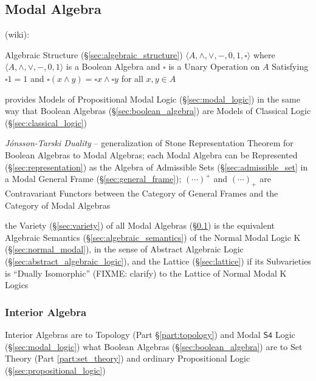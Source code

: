 \subsection{Modal Algebra}\label{sec:modal_algebra}

(wiki):

Algebraic Structure (\S\ref{sec:algebraic_structure}) $\langle{A, \wedge, \vee,
  -, 0, 1, \square}\rangle$ where $\langle{A, \wedge, \vee, -, 0, 1}\rangle$ is
a Boolean Algebra and $\square$ is a Unary Operation on $A$ Satisfying
$\square{1} = 1$ and $\square(x \wedge y) = \square x \wedge \square y$ for all
$x, y \in A$

provides Models of Propositional Modal Logic (\S\ref{sec:modal_logic}) in the
same way that Boolean Algebras (\S\ref{sec:boolean_algebra}) are Models of
Classical Logic (\S\ref{sec:classical_logic})

\emph{J\'onsson-Tarski Duality} -- generalization of Stone Representation
Theorem for Boolean Algebras to Modal Algebras; each Modal Algebra can be
Represented (\S\ref{sec:representation}) as the Algebra of Admissible Sets
(\S\ref{sec:admissible_set} in a Modal General Frame
(\S\ref{sec:general_frame}); $(\cdots)^+$ and $(\cdots)_+$ are Contravariant
Functors between the Category of General Frames and the Category of Modal
Algebras

the Variety (\S\ref{sec:variety}) of all Modal Algebras
(\S\ref{sec:modal_algebra}) is the equivalent Algebraic Semantics
(\S\ref{sec:algebraic_semantics}) of the Normal Modal Logic $\mathrm{K}$
(\S\ref{sec:normal_modal}), in the sense of Abstract Algebraic Logic
(\S\ref{sec:abstract_algebraic_logic}), and the Lattice (\S\ref{sec:lattice}) if
its Subvarieties is ``Dually Isomorphic'' (FIXME: clarify) to the Lattice of
Normal Modal $\mathrm{K}$ Logics



\subsubsection{Interior Algebra}\label{sec:interior_algebra}

Interior Algebras are to Topology (Part \S\ref{part:topology}) and Modal
$\mathsf{S4}$ Logic (\S\ref{sec:modal_logic}) what Boolean Algebras
(\S\ref{sec:boolean_algebra}) are to Set Theory (Part \ref{part:set_theory}) and
ordinary Propositional Logic (\S\ref{sec:propositional_logic})

